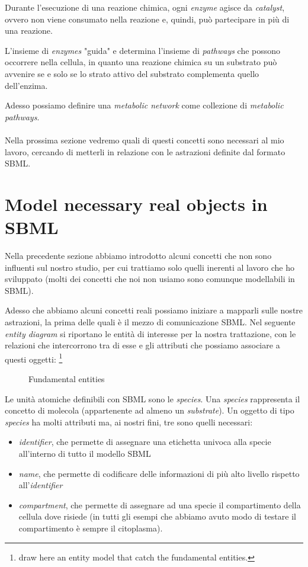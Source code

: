 Durante l'esecuzione di una reazione chimica, ogni \emph{enzyme}
agisce da \emph{catalyst}, ovvero non viene consumato nella reazione
e, quindi, pu\`o partecipare in pi\`u di una reazione.

L'insieme di \emph{enzymes} "guida" e determina l'insieme di
\emph{pathways} che possono occorrere nella cellula, in quanto una
reazione chimica su un substrato pu\`o avvenire se e solo se lo strato
attivo del substrato complementa quello dell'enzima.

Adesso possiamo definire una \emph{metabolic network} come collezione
di \emph{metabolic pathways}.
\\\\
Nella prossima sezione vedremo quali di questi concetti sono necessari
al mio lavoro, cercando di metterli in relazione con le astrazioni
definite dal formato SBML.

\section{Model necessary real objects in SBML}
\label{sec:necessaryRealObjectsModeledInSBML}

Nella precedente sezione abbiamo introdotto alcuni concetti che non
sono influenti sul nostro studio, per cui trattiamo solo quelli
inerenti al lavoro che ho sviluppato (molti dei concetti che noi non
usiamo sono comunque modellabili in SBML).

Adesso che abbiamo alcuni concetti reali possiamo iniziare a mapparli
sulle nostre astrazioni, la prima delle quali \`e il mezzo di
comunicazione SBML. Nel seguente \emph{entity diagram} si riportano le
entit\`a di interesse per la nostra trattazione, con le relazioni che
intercorrono tra di esse e gli attributi che possiamo associare a
questi oggetti: \footnote{draw here an entity model that catch the
  fundamental entities.}
\begin{figure}
  \centering
  
  \caption{Fundamental entities}
  \label{fig:FundamentalEntities}
\end{figure}
Le unit\`a atomiche definibili con SBML sono le \emph{species}. Una
\emph{species} rappresenta il concetto di molecola (appartenente ad
almeno un \emph{substrate}).  Un oggetto di tipo \emph{species} ha
molti attributi ma, ai nostri fini, tre sono quelli necessari:
\begin{itemize}
\item \emph{identifier}, che permette di assegnare una etichetta univoca
alla specie all'interno di tutto il modello SBML
\item \emph{name}, che permette di codificare delle informazioni di
  pi\`u alto livello rispetto all'\emph{identifier}
\item \emph{compartment}, che permette di assegnare ad una specie il
compartimento della cellula dove risiede (in tutti gli esempi che
abbiamo avuto modo di testare il compartimento \`e sempre il
citoplasma).
\end{itemize}

